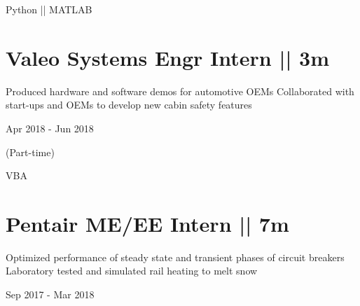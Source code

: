 \vspace{-1.5ex}
{
\vspace{1.8ex}
\color{cyan}\small
{Python || MATLAB} %
}
\vspace{-1.5ex}

\section
{\textbf{Valeo}
\newline
Systems Engr Intern || 3m}

\BulletItem
\vspace{-2.5ex}
\begin{detail}
\BulletItem
 Produced hardware and software demos for automotive OEMs
\BulletItem
 Collaborated with start-ups and OEMs to develop new cabin safety features
\end{detail}

\begin{subtitle}
\vspace{-7.8ex}
{{Apr 2018 - Jun 2018}}
\end{subtitle}

\begin{subtitle}
\vspace{-2.0ex}
{{(Part-time)}} 
\end{subtitle}

\vspace{-4ex}
{
\vspace{1.8ex}
\color{cyan}\small
{VBA} %
}
\vspace{-1.5ex}

\section
{\textbf{Pentair}
\newline
ME/EE Intern  || 7m}

\BulletItem
\vspace{-2.5ex}
\begin{detail}

\BulletItem
 Optimized performance of steady state and transient phases of circuit breakers
\BulletItem
 Laboratory tested and simulated rail heating to melt snow
\end{detail}

\begin{subtitle}
\vspace{-7.8ex}
{{Sep 2017 - Mar 2018}}
\end{subtitle}
\vspace{0ex}

